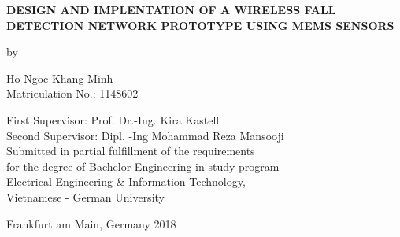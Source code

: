 \begin{titlepage}
\begin{center}
        \vspace*{2.3cm}
        \Large
        {\bf DESIGN AND IMPLENTATION OF A WIRELESS FALL DETECTION NETWORK PROTOTYPE USING MEMS SENSORS}

        \vspace*{0.5cm}

        \normalsize
        by \\

        \vspace*{0.5cm}

        \Large
        Ho Ngoc Khang Minh \\
      	\normalsize
      	\vspace{0.2cm}
		Matriculation No.: 1148602
		
        \vspace*{1.5cm}
        \large
       	First Supervisor: Prof. Dr.-Ing. Kira Kastell \\
       	Second Supervisor: Dipl. -Ing Mohammad Reza Mansooji \\
       	\vspace{1.7cm}
        \normalsize
        Submitted in partial fulfillment of the requirements\\
        for the degree of Bachelor Engineering in study program\\
        Electrical Engineering \& Information Technology,\\
        Vietnamese - German University

        \vspace*{3.0cm}
		
        Frankfurt am Main, Germany 2018 \\
	
        
        \end{center}
\end{titlepage}

\pagestyle{plain}
\setcounter{page}{2}
\cleardoublepage
 


  
